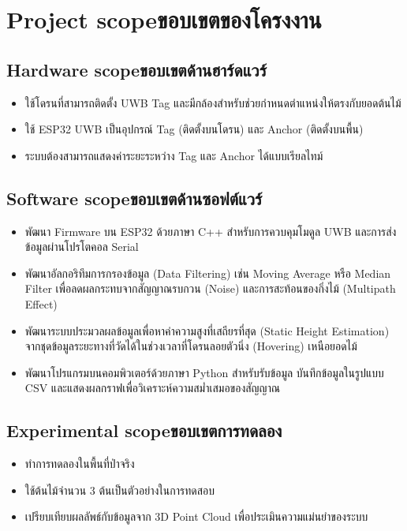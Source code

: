 \section{\ifenglish Project scope\else ขอบเขตของโครงงาน\fi}

\subsection{\ifenglish Hardware scope\else ขอบเขตด้านฮาร์ดแวร์\fi}
\begin{itemize}
    \item ใช้โดรนที่สามารถติดตั้ง UWB Tag และมีกล้องสำหรับช่วยกำหนดตำแหน่งให้ตรงกับยอดต้นไม้
    \item ใช้ ESP32 UWB เป็นอุปกรณ์ Tag (ติดตั้งบนโดรน) และ Anchor (ติดตั้งบนพื้น)
    \item ระบบต้องสามารถแสดงค่าระยะระหว่าง Tag และ Anchor ได้แบบเรียลไทม์
\end{itemize}

\subsection{\ifenglish Software scope\else ขอบเขตด้านซอฟต์แวร์\fi}
\begin{itemize}
    \item พัฒนา Firmware บน ESP32 ด้วยภาษา C++ สำหรับการควบคุมโมดูล UWB และการส่งข้อมูลผ่านโปรโตคอล Serial
    \item พัฒนาอัลกอริทึมการกรองข้อมูล (Data Filtering) เช่น Moving Average หรือ Median Filter เพื่อลดผลกระทบจากสัญญาณรบกวน (Noise) และการสะท้อนของกิ่งไม้ (Multipath Effect)
    \item พัฒนาระบบประมวลผลข้อมูลเพื่อหาค่าความสูงที่เสถียรที่สุด (Static Height Estimation) จากชุดข้อมูลระยะทางที่วัดได้ในช่วงเวลาที่โดรนลอยตัวนิ่ง (Hovering) เหนือยอดไม้
    \item พัฒนาโปรแกรมบนคอมพิวเตอร์ด้วยภาษา Python สำหรับรับข้อมูล บันทึกข้อมูลในรูปแบบ CSV และแสดงผลกราฟเพื่อวิเคราะห์ความสม่ำเสมอของสัญญาณ
\end{itemize}

\subsection{\ifenglish Experimental scope\else ขอบเขตการทดลอง\fi}
\begin{itemize}
    \item ทำการทดลองในพื้นที่ป่าจริง
    \item ใช้ต้นไม้จำนวน 3 ต้นเป็นตัวอย่างในการทดสอบ
    \item เปรียบเทียบผลลัพธ์กับข้อมูลจาก 3D Point Cloud เพื่อประเมินความแม่นยำของระบบ
\end{itemize}

